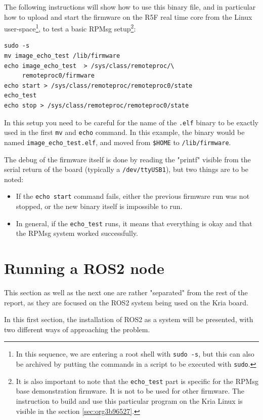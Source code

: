 \documentclass[10pt]{article}
\begin{document}
The following instructions will show how to use this binary file, and
in particular how to upload and start the firmware on the R5F real time core
from the Linux user-space\footnote{In this sequence, we are entering a root shell with \texttt{sudo -s}, but this can
also be archived by putting the commands in a script to be executed with \texttt{sudo}.}, to test a basic RPMsg setup\footnote{It is also important to note that the \texttt{echo\_test} part is specific for the
RPMsg base demonstration firmware. It is not to be used for other firmware.
The instruction to build and use this particular program on the Kria Linux
is visible in the section \ref{sec:org3b96527}.}:
\begin{verbatim}
sudo -s
mv image_echo_test /lib/firmware
echo image_echo_test  > /sys/class/remoteproc/\
     remoteproc0/firmware
echo start > /sys/class/remoteproc/remoteproc0/state
echo_test
echo stop > /sys/class/remoteproc/remoteproc0/state
\end{verbatim}

In this setup you need to be careful for the name of the \texttt{.elf} binary to be exactly used
in the first \texttt{mv} and \texttt{echo} command. In this example, the binary would be named
\texttt{image\_echo\_test.elf}, and moved from \texttt{\$HOME} to \texttt{/lib/firmware}.

The debug of the firmware itself is done by reading the "printf" visible from the serial
return of the board (typically a \texttt{/dev/ttyUSB1}), but two things are to be noted:
\begin{itemize}
\item If the \texttt{echo start} command fails, either the previous firmware run was not stopped,
or the new binary itself is impossible to run.
\item In general, if the \texttt{echo\_test} runs, it means that everything is okay and that
the RPMsg system worked successfully.
\end{itemize}
\pagebreak

\section{Running a ROS2 node}
\label{sec:org59dffb9}
This section as well as the next one are rather "separated" from the rest of the report, as
they are focused on the ROS2 system being used on the Kria board.

In this first section, the installation of ROS2 as a system will be presented, with
two different ways of approaching the problem.
\end{document}
